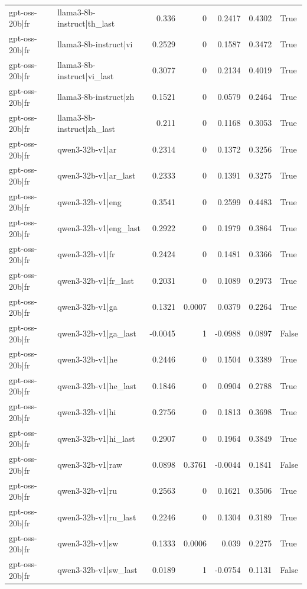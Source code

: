 \begin{table}
\begin{tabular}{l l r r r r l}
gpt-oss-20b|fr & llama3-8b-instruct|th_last & 0.336 & 0 & 0.2417 & 0.4302 & True \\
gpt-oss-20b|fr & llama3-8b-instruct|vi & 0.2529 & 0 & 0.1587 & 0.3472 & True \\
gpt-oss-20b|fr & llama3-8b-instruct|vi_last & 0.3077 & 0 & 0.2134 & 0.4019 & True \\
gpt-oss-20b|fr & llama3-8b-instruct|zh & 0.1521 & 0 & 0.0579 & 0.2464 & True \\
gpt-oss-20b|fr & llama3-8b-instruct|zh_last & 0.211 & 0 & 0.1168 & 0.3053 & True \\
gpt-oss-20b|fr & qwen3-32b-v1|ar & 0.2314 & 0 & 0.1372 & 0.3256 & True \\
gpt-oss-20b|fr & qwen3-32b-v1|ar_last & 0.2333 & 0 & 0.1391 & 0.3275 & True \\
gpt-oss-20b|fr & qwen3-32b-v1|eng & 0.3541 & 0 & 0.2599 & 0.4483 & True \\
gpt-oss-20b|fr & qwen3-32b-v1|eng_last & 0.2922 & 0 & 0.1979 & 0.3864 & True \\
gpt-oss-20b|fr & qwen3-32b-v1|fr & 0.2424 & 0 & 0.1481 & 0.3366 & True \\
gpt-oss-20b|fr & qwen3-32b-v1|fr_last & 0.2031 & 0 & 0.1089 & 0.2973 & True \\
gpt-oss-20b|fr & qwen3-32b-v1|ga & 0.1321 & 0.0007 & 0.0379 & 0.2264 & True \\
gpt-oss-20b|fr & qwen3-32b-v1|ga_last & -0.0045 & 1 & -0.0988 & 0.0897 & False \\
gpt-oss-20b|fr & qwen3-32b-v1|he & 0.2446 & 0 & 0.1504 & 0.3389 & True \\
gpt-oss-20b|fr & qwen3-32b-v1|he_last & 0.1846 & 0 & 0.0904 & 0.2788 & True \\
gpt-oss-20b|fr & qwen3-32b-v1|hi & 0.2756 & 0 & 0.1813 & 0.3698 & True \\
gpt-oss-20b|fr & qwen3-32b-v1|hi_last & 0.2907 & 0 & 0.1964 & 0.3849 & True \\
gpt-oss-20b|fr & qwen3-32b-v1|raw & 0.0898 & 0.3761 & -0.0044 & 0.1841 & False \\
gpt-oss-20b|fr & qwen3-32b-v1|ru & 0.2563 & 0 & 0.1621 & 0.3506 & True \\
gpt-oss-20b|fr & qwen3-32b-v1|ru_last & 0.2246 & 0 & 0.1304 & 0.3189 & True \\
gpt-oss-20b|fr & qwen3-32b-v1|sw & 0.1333 & 0.0006 & 0.039 & 0.2275 & True \\
gpt-oss-20b|fr & qwen3-32b-v1|sw_last & 0.0189 & 1 & -0.0754 & 0.1131 & False \\

\end{tabular}
\end{table}
